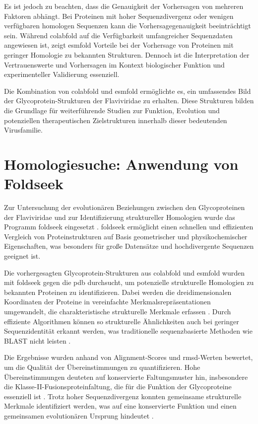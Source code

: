 Es ist jedoch zu beachten, dass die Genauigkeit der Vorhersagen von mehreren Faktoren abhängt. Bei Proteinen mit hoher Sequenzdivergenz oder wenigen verfügbaren homologen Sequenzen kann die Vorhersagegenauigkeit beeinträchtigt sein. Während \gls{colabfold} auf die Verfügbarkeit umfangreicher Sequenzdaten angewiesen ist, zeigt \gls{esmfold} Vorteile bei der Vorhersage von Proteinen mit geringer Homologie zu bekannten Strukturen. Dennoch ist die Interpretation der Vertrauenswerte und Vorhersagen im Kontext biologischer Funktion und experimenteller Validierung essenziell.

Die Kombination von \gls{colabfold} und \gls{esmfold} ermöglichte es, ein umfassendes Bild der Glycoprotein-Strukturen der Flaviviridae zu erhalten. Diese Strukturen bilden die Grundlage für weiterführende Studien zur Funktion, Evolution und potenziellen therapeutischen Zielstrukturen innerhalb dieser bedeutenden Virusfamilie.

\section{Homologiesuche: Anwendung von Foldseek} \label{sec:foldseek}

Zur Untersuchung der evolutionären Beziehungen zwischen den Glycoproteinen der Flaviviridae und zur Identifizierung struktureller Homologien wurde das Programm \gls{foldseek} eingesetzt \autocite{vankempenFastAccurateProtein2024}. \gls{foldseek} ermöglicht einen schnellen und effizienten Vergleich von Proteinstrukturen auf Basis geometrischer und physikochemischer Eigenschaften, was besonders für große Datensätze und hochdivergente Sequenzen geeignet ist.

Die vorhergesagten Glycoprotein-Strukturen aus \gls{colabfold} und \gls{esmfold} wurden mit \gls{foldseek} gegen die \gls{pdb} durchsucht, um potenzielle strukturelle Homologien zu bekannten Proteinen zu identifizieren. Dabei werden die dreidimensionalen Koordinaten der Proteine in vereinfachte Merkmalsrepräsentationen umgewandelt, die charakteristische strukturelle Merkmale erfassen \autocite{vankempenFastAccurateProtein2024}. Durch effiziente Algorithmen können so strukturelle Ähnlichkeiten auch bei geringer Sequenzidentität erkannt werden, was traditionelle sequenzbasierte Methoden wie BLAST nicht leisten \autocite{Altschul1990}.

Die Ergebnisse wurden anhand von Alignment-Scores und \gls{rmsd}-Werten bewertet, um die Qualität der Übereinstimmungen zu quantifizieren. Hohe Übereinstimmungen deuteten auf konservierte Faltungsmuster hin, insbesondere die Klasse-II-Fusionsproteinfaltung, die für die Funktion der Glycoproteine essenziell ist \autocite{Kielian2006}. Trotz hoher Sequenzdivergenz konnten gemeinsame strukturelle Merkmale identifiziert werden, was auf eine konservierte Funktion und einen gemeinsamen evolutionären Ursprung hindeutet \autocite{Chothia1986}.

